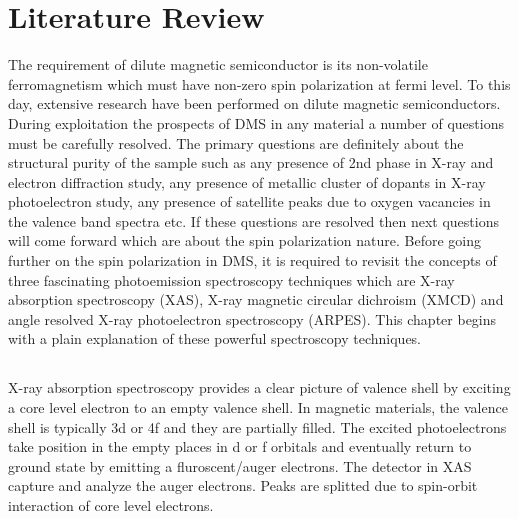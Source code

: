 \documentclass[main.tex]{subfiles}
\begin{document}
\chapter{Literature Review}

\thispagestyle{empty}

\pagestyle{fancy}
\fancyhf{}

\lhead{\chaptername \ \thechapter}

The requirement of dilute magnetic semiconductor is its non-volatile ferromagnetism which must have non-zero spin polarization at fermi level. To this day, extensive research have been performed on dilute magnetic semiconductors. During exploitation the prospects of DMS in any material a number of questions must be carefully resolved. The primary questions are definitely about the structural purity of the sample such as any presence of 2nd phase in X-ray and electron diffraction study, any presence of metallic cluster of dopants in X-ray photoelectron study, any presence of satellite peaks due to oxygen vacancies in the valence band spectra etc. If these questions are resolved then next questions will come forward which are about the spin polarization nature. Before going further on the spin polarization in DMS, it is required to revisit the concepts of three fascinating photoemission spectroscopy techniques which are X-ray absorption spectroscopy (XAS), X-ray magnetic circular dichroism (XMCD) and angle resolved X-ray photoelectron spectroscopy (ARPES). This chapter begins with a plain explanation of these powerful spectroscopy techniques. 

\section{}

X-ray absorption spectroscopy provides a clear picture of valence shell by exciting a core level electron to an empty valence shell. In magnetic materials, the valence shell is typically 3d or 4f and they are partially filled. The excited photoelectrons take position in the empty places in d or f orbitals and eventually return to ground state by emitting a fluroscent/auger electrons. The detector in XAS capture and analyze the auger electrons. Peaks are splitted due to spin-orbit interaction of core level electrons. 
\end{document}
